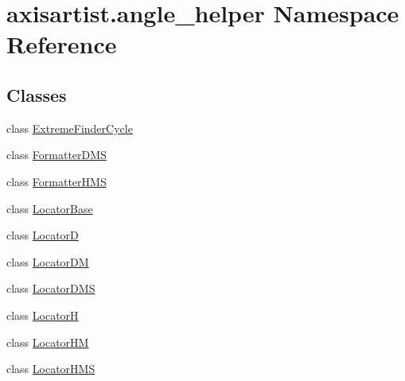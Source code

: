 \hypertarget{namespaceaxisartist_1_1angle__helper}{}\section{axisartist.\+angle\+\_\+helper Namespace Reference}
\label{namespaceaxisartist_1_1angle__helper}
\subsection*{Classes}
\begin{DoxyCompactItemize}
\item 
class \hyperlink{classaxisartist_1_1angle__helper_1_1ExtremeFinderCycle}{Extreme\+Finder\+Cycle}
\item 
class \hyperlink{classaxisartist_1_1angle__helper_1_1FormatterDMS}{Formatter\+D\+MS}
\item 
class \hyperlink{classaxisartist_1_1angle__helper_1_1FormatterHMS}{Formatter\+H\+MS}
\item 
class \hyperlink{classaxisartist_1_1angle__helper_1_1LocatorBase}{Locator\+Base}
\item 
class \hyperlink{classaxisartist_1_1angle__helper_1_1LocatorD}{LocatorD}
\item 
class \hyperlink{classaxisartist_1_1angle__helper_1_1LocatorDM}{Locator\+DM}
\item 
class \hyperlink{classaxisartist_1_1angle__helper_1_1LocatorDMS}{Locator\+D\+MS}
\item 
class \hyperlink{classaxisartist_1_1angle__helper_1_1LocatorH}{LocatorH}
\item 
class \hyperlink{classaxisartist_1_1angle__helper_1_1LocatorHM}{Locator\+HM}
\item 
class \hyperlink{classaxisartist_1_1angle__helper_1_1LocatorHMS}{Locator\+H\+MS}
\end{DoxyCompactItemize}
